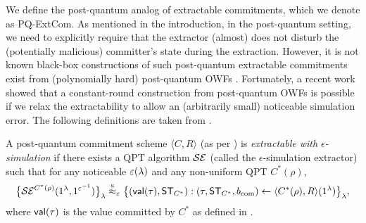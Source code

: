 We define the post-quantum analog of extractable commitments, which we denote as PQ-ExtCom. As mentioned in the introduction, in the post-quantum setting, we need to explicitly require that the extractor (almost) does not disturb the (potentially malicious) committer's state during the extraction. However, it is not known black-box constructions of such post-quantum extractable commitments exist from (polynomially hard) post-quantum OWFs \cite{chia2022impossibility}.  
Fortunately, a recent work \cite{C:CCLY22} showed that a constant-round construction from post-quantum OWFs is possible if we relax the extractability to allow an (arbitrarily small) noticeable simulation error. The following definitions are taken from \cite{C:CCLY22}.


\begin{definition}\label{def:epsilon-sim-ext-com:strong}
A post-quantum commitment scheme $\langle C, R\rangle$ (as per ) is {\em extractable with $\epsilon$-simulation} if there exists a QPT algorithm $\mathcal{SE}$ (called the $\epsilon$-simulation extractor) such that for any noticeable $\varepsilon(\lambda)$ and any non-uniform QPT $C^*(\rho)$, 
\begin{equation*}
\big\{ \mathcal{SE}^{C^*(\rho)}(1^\lambda,1^{\varepsilon^{-1}}) \big\}_\lambda
\stackrel{\text{s}}{\approx}_\varepsilon
\big\{(\mathsf{val}(\tau), \mathsf{ST}_{C^*}):(\tau,\mathsf{ST}_{C^*},b_{\mathrm{com}}) \gets \langle C^*(\rho), R \rangle(1^\lambda)\big\}_\lambda,  
\end{equation*}
where $\mathsf{val}(\tau)$ is the value committed by $C^*$ as defined in .
\end{definition}



